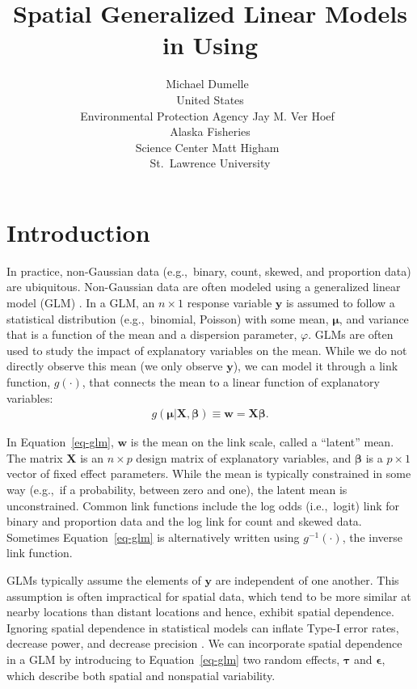 \documentclass[
]{jss}
\author{
Michael Dumelle~\orcidlink{0000-0002-3393-5529}\\United States\\
Environmental Protection Agency \And Jay M. Ver
Hoef~\orcidlink{0000-0003-4302-6895}\\Alaska Fisheries\\
Science Center \And Matt
Higham~\orcidlink{0009-0006-4217-625X}\\St.~Lawrence University
}
\title{Spatial Generalized Linear Models in \proglang{R} Using
\pkg{spmodel}}
\begin{document}
\newpage

\section{Introduction}\label{sec-intro}

In practice, non-Gaussian data (e.g.,~binary, count, skewed, and
proportion data) are ubiquitous. Non-Gaussian data are often modeled
using a generalized linear model (GLM)
\citep{nelder1972generalized, mccullagh1989generalized}. In a GLM, an
\(n \times 1\) response variable \(\mathbf{y}\) is assumed to follow a
statistical distribution (e.g.,~binomial, Poisson) with some mean,
\(\boldsymbol \mu\), and variance that is a function of the mean and a
dispersion parameter, \(\varphi\). GLMs are often used to study the
impact of explanatory variables on the mean. While we do not directly
observe this mean (we only observe \(\mathbf{y}\)), we can model it
through a link function, \(g(\cdot)\), that connects the mean to a
linear function of explanatory variables: \begin{align}\label{eq-glm}
g(\boldsymbol{\mu}|\mathbf{X}, \boldsymbol{\beta}) \equiv \mathbf{w} = \mathbf{X} \boldsymbol{\beta}.
\end{align}

In Equation~\ref{eq-glm}, \(\mathbf{w}\) is the mean on the link scale,
called a ``latent'' mean. The matrix \(\mathbf{X}\) is an \(n \times p\)
design matrix of explanatory variables, and \(\boldsymbol{\beta}\) is a
\(p \times 1\) vector of fixed effect parameters. While the mean is
typically constrained in some way (e.g.,~if a probability, between zero
and one), the latent mean is unconstrained. Common link functions
include the log odds (i.e.,~logit) link for binary and proportion data
and the log link for count and skewed data. Sometimes
Equation~\ref{eq-glm} is alternatively written using \(g^{-1}(\cdot)\),
the inverse link function.

GLMs typically assume the elements of \(\mathbf{y}\) are independent of
one another. This assumption is often impractical for spatial data,
which tend to be more similar at nearby locations than distant locations
\citep{tobler1970computer} and hence, exhibit spatial dependence.
Ignoring spatial dependence in statistical models can inflate Type-I
error rates, decrease power, and decrease precision
\citep{legendre1993spatial}. We can incorporate spatial dependence in a
GLM by introducing to Equation~\ref{eq-glm} two random effects,
\(\boldsymbol{\tau}\) and \(\boldsymbol{\epsilon}\), which describe both
spatial and nonspatial variability.
\end{document}
